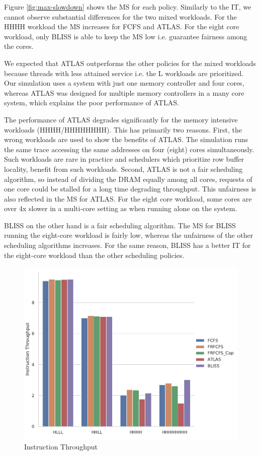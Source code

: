 \documentclass[a4paper]{article}
\newcommand{\wl}[1]{\textsf{\small #1}}
\begin{document}
Figure \ref{fig:max-slowdown} shows the MS for each policy. Similarly to the IT,
we cannot observe substantial differences for the two mixed workloads. For the
\wl{HHHH} workload the MS increases for FCFS and ATLAS. For the eight core workload,
only BLISS is able to keep the MS low i.e. guarantee fairness among the cores.

We expected that ATLAS outperforms the other policies for the mixed workloads because
threads with less attained service i.e. the L workloads are prioritized. Our
simulation uses a system with just one memory controller and four cores, whereas
ATLAS was designed for multiple memory controllers in a many core system, which
explains the poor performance of ATLAS.

The performance of ATLAS degrades significantly for the memory intensive workloads
(\wl{HHHH/HHHHHHHH}). This has primarily two reasons. First, the wrong workloads are
used to show the benefits of ATLAS. The simulation runs the same trace accessing the
same addresses on four (eight) cores simultaneously. Such workloads are rare in practice
and schedulers which prioritize row buffer locality, benefit from such workloads. Second,
ATLAS is not a fair scheduling algorithm, so instead of dividing the DRAM equally among
all cores, requests of one core could be stalled for a long time degrading throughput.
This unfairness is also reflected in the MS for ATLAS. For the eight core workload, some
cores are over 4x slower in a multi-core setting as when running alone on the system.

BLISS on the other hand is a fair scheduling algorithm. The MS for BLISS running the
eight-core workload is fairly low, whereas the unfairness of the other scheduling
algorithms increases. For the same reason, BLISS has a better IT for the eight-core
workload than the other scheduling policies.

\begin{figure}
    \centering
    \includegraphics[width=\textwidth]{inst_throughput}
    \caption{Instruction Throughput}
    \label{fig:inst-throughput}
\end{figure}
\end{document}
